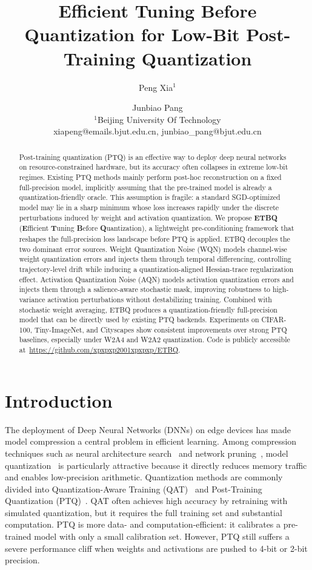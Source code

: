 \documentclass{article}
\title{Efficient Tuning Before Quantization for Low-Bit Post-Training Quantization}
\author{
Peng Xia$^1$
\and
Junbiao Pang
\\
\affiliations
$^1$Beijing University Of Technology\\
\emails
xiapeng@emails.bjut.edu.cn,
junbiao\_pang@bjut.edu.cn
}
\begin{document}
\maketitle

\begin{abstract}
Post-training quantization (PTQ) is an effective way to deploy deep neural networks on resource-constrained hardware, but its accuracy often collapses in extreme low-bit regimes. Existing PTQ methods mainly perform post-hoc reconstruction on a fixed full-precision model, implicitly assuming that the pre-trained model is already a quantization-friendly oracle. This assumption is fragile: a standard SGD-optimized model may lie in a sharp minimum whose loss increases rapidly under the discrete perturbations induced by weight and activation quantization. We propose \textbf{ETBQ} (\textbf{E}fficient \textbf{T}uning \textbf{B}efore \textbf{Q}uantization), a lightweight pre-conditioning framework that reshapes the full-precision loss landscape before PTQ is applied. ETBQ decouples the two dominant error sources. Weight Quantization Noise (WQN) models channel-wise weight quantization errors and injects them through temporal differencing, controlling trajectory-level drift while inducing a quantization-aligned Hessian-trace regularization effect. Activation Quantization Noise (AQN) models activation quantization errors and injects them through a salience-aware stochastic mask, improving robustness to high-variance activation perturbations without destabilizing training. Combined with stochastic weight averaging, ETBQ produces a quantization-friendly full-precision model that can be directly used by existing PTQ backends. Experiments on CIFAR-100, Tiny-ImageNet, and Cityscapes show consistent improvements over strong PTQ baselines, especially under W2A4 and W2A2 quantization. Code is publicly accessible at~\url{https://github.com/xpxpxp2001xpxpxp/ETBQ}.
\end{abstract}

\section{Introduction}
\label{sec:intro}

The deployment of Deep Neural Networks (DNNs) on edge devices has made model compression a central problem in efficient learning. Among compression techniques such as neural architecture search~\cite{zoph-nas-arxiv-2016} and network pruning~\cite{han2-purn-arxiv-2015}, model quantization~\cite{li-brecq-arxiv-2021,esser-lsq-arxiv-2019} is particularly attractive because it directly reduces memory traffic and enables low-precision arithmetic. Quantization methods are commonly divided into Quantization-Aware Training (QAT)~\cite{esser-lsq-arxiv-2019,nagel-ooq-icml-2022} and Post-Training Quantization (PTQ)~\cite{nagel-adaround-icml-2020,li-brecq-arxiv-2021,wei-qdrop-arxiv-2022}. QAT often achieves high accuracy by retraining with simulated quantization, but it requires the full training set and substantial computation. PTQ is more data- and computation-efficient: it calibrates a pre-trained model with only a small calibration set. However, PTQ still suffers a severe performance cliff when weights and activations are pushed to 4-bit or 2-bit precision.
\end{document}
